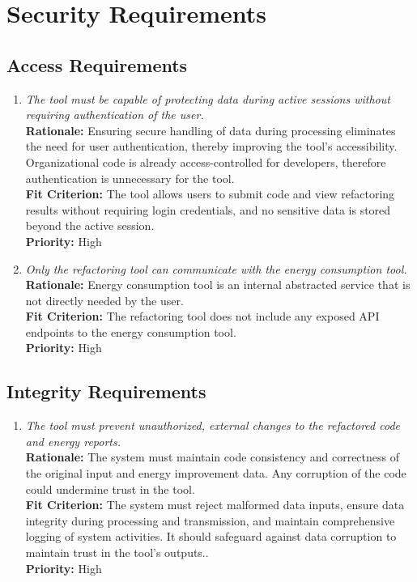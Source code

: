 \documentclass[12pt]{article}
\begin{document}
\section{Security Requirements}
\subsection{Access Requirements}
\begin{enumerate}[label=SR-AR \arabic*., wide=0pt, leftmargin=*]
  \item \emph{The tool must be capable of protecting data during
    active sessions without requiring authentication of the user.}\\[2mm]
    {\bf Rationale:} Ensuring secure handling of data during
    processing eliminates the need for user authentication, thereby
    improving the tool's accessibility. Organizational code is
    already access-controlled for developers, therefore
    authentication is unnecessary for the tool.\\
    {\bf Fit Criterion:} The tool allows users to submit code and
    view refactoring results without requiring login credentials, and
    no sensitive data is stored beyond the active session.\\
    {\bf Priority:} High
  \item \emph{Only the refactoring tool can communicate with the
    energy consumption tool.}\\
    {\bf Rationale:} Energy consumption tool is an internal
    abstracted service that is not directly needed by the user.\\
    {\bf Fit Criterion:} The refactoring tool does not include any
    exposed API endpoints to the energy consumption tool.\\
    {\bf Priority:} High
\end{enumerate}
\subsection{Integrity Requirements}
\begin{enumerate}[label=SR-IR \arabic*., wide=0pt, leftmargin=*]
  \item \emph{The tool must prevent unauthorized, external changes to
    the refactored code and energy reports.}\\[2mm]
    {\bf Rationale:} The system must maintain code consistency and
    correctness of the original input and energy improvement data.
    Any corruption of the code could undermine trust in the tool.\\
    {\bf Fit Criterion:} The system must reject malformed data
    inputs, ensure data integrity during processing and transmission,
    and maintain comprehensive logging of system activities. It
    should safeguard against data corruption to maintain trust in the
    tool's outputs..\\
    {\bf Priority:} High
\end{enumerate}
\end{document}
